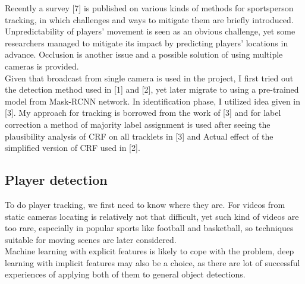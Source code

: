 \documentclass{article}
\begin{document}
Recently a survey [7] is published on various kinds of methods for sportsperson tracking, in which challenges and ways to mitigate them are briefly introduced. Unpredictability of players’ movement is seen as an obvious challenge, yet some researchers managed to mitigate its impact by predicting players’ locations in advance. Occlusion is another issue and a possible solution of using multiple cameras is provided.\\
Given that broadcast from single camera is used in the project, I first tried out the detection method used in [1] and [2], yet later migrate to using a pre-trained model from Mask-RCNN network. In identification phase, I utilized idea given in [3]. My approach for tracking is borrowed from the work of [3] and for label correction a method of majority label assignment is used after seeing the plausibility analysis of CRF on all tracklets in [3] and Actual effect of the simplified version of CRF used in [2].
\subsection{Player detection}
To do player tracking, we first need to know where they are. For videos from static cameras locating is relatively not that difficult, yet such kind of videos are too rare, especially in popular sports like football and basketball, so techniques suitable for moving scenes are later considered. \\
Machine learning with explicit features is likely to cope with the problem, deep learning with implicit features may also be a choice, as there are lot of successful experiences of applying both of them to general object detections.
\end{document}
